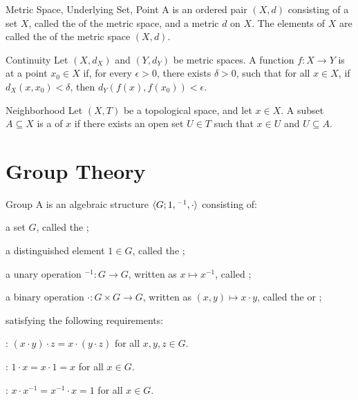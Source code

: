 \documentclass[12pt]{report}
\begin{document}
\begin{dfnbox}{Metric Space, Underlying Set, Point}
	A  is an ordered pair $(X, d)$ consisting of a set $X$, called the  of the metric space, and a metric $d$ on $X$. The elements of $X$ are called the  of the metric space $(X, d)$.
\end{dfnbox}

\begin{dfnbox}{Continuity}
	Let $(X, d_X)$ and $(Y, d_Y)$ be metric spaces. A function $f: X \to Y$ is  at a point $x_0 \in X$ if, for every $\epsilon > 0$, there exists $\delta > 0$, such that for all $x \in X$, if $d_X(x, x_0) < \delta$, then $d_Y(f(x), f(x_0)) < \epsilon$.
\end{dfnbox}

\begin{dfnbox}{Neighborhood}
Let $(X, T)$ be a topological space, and let $x \in X$. A subset $A \subseteq X$ is a  of $x$ if there exists an open set $U \in T$ such that $x \in U$ and $U \subseteq A$.
\end{dfnbox}



\chapter{Group Theory}

\begin{dfnbox}{Group}
	A  is an algebraic structure ${\langle {G; 1, {}^{-1}, \cdot} \rangle}$ consisting of:
	\begin{boxitems}
		\item a set $G$, called the ;
		\item a distinguished element $1 \in G$, called the ;
		\item a unary operation ${}^{-1}: G \to G$, written as $x \mapsto x^{-1}$, called ;
		\item a binary operation $\cdot: G \times G \to G$, written as $(x, y) \mapsto x \cdot y$, called the  or ;
	\end{boxitems}
	satisfying the following requirements:
	\begin{boxitems}
		\item {}: $(x \cdot y) \cdot z = x \cdot (y \cdot z)$ for all $x, y, z \in G$.
		\item {}: $1 \cdot x = x \cdot 1 = x$ for all $x \in G$.
		\item {}: $x \cdot x^{-1} = x^{-1} \cdot x = 1$ for all $x \in G$.
	\end{boxitems}
\end{dfnbox}
\end{document}
